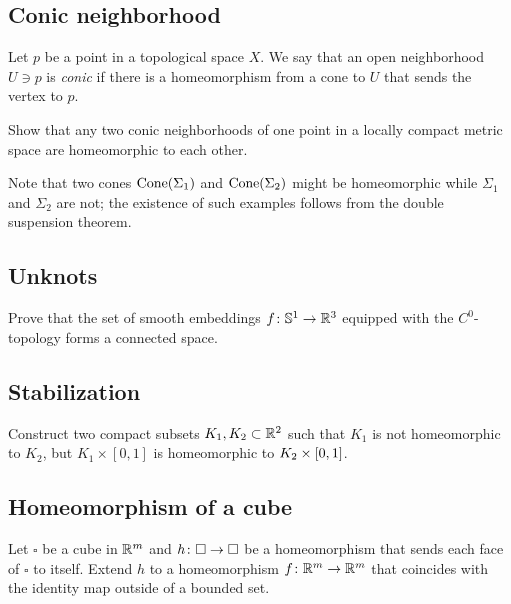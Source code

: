 \subsection*{Conic neighborhood}
\label{Conic neighborhood}

Let $p$ be a point in a topological space $X$.
We say that an open neighborhood $U\ni p$ is \emph{conic}
if there is a homeomorphism from a cone
to $U$ that sends the vertex to $p$.

\begin{pr}  
Show that any two conic neighborhoods of one point in a locally compact metric space are homeomorphic to each other.
\end{pr}

Note that two cones $\mathop{\rm Cone}(\Sigma_1)$ and $\mathop{\rm Cone}(\Sigma_2)$ might be homeomorphic while $\Sigma_1$ and $\Sigma_2$ are not;
the existence of such examples follows from the double suspension theorem.

\subsection*{Unknots\easy}\label{No knots}

\begin{pr}
Prove that the set of smooth embeddings $f\:\mathbb{S}^1\z\to\RR^3$ equipped with the $C^0$-topology 
forms a connected space.
\end{pr}

\subsection*{Stabilization}\label{Simple stabilization}

\begin{pr}
Construct two compact subsets $K_1, K_2\subset\mathbb{R}^2$ such that
$K_1$ is not homeomorphic to $K_2$, but $K_1\times[0,1]$ is homeomorphic to $K_2\z\times[0,1]$.
\end{pr}

\subsection*{Homeomorphism of a cube}\label{Homeomorphism of cube}

\begin{pr}
Let $\square$ be a cube in $\mathbb{R}^m$
and $h\:\square\z\to\square$ be
a homeomorphism that sends each face of $\square$ to itself.
Extend $h$ to a homeomorphism $f\:\RR^m\z\to\RR^m$ that coincides with the identity map outside of a bounded set.    
\end{pr}


